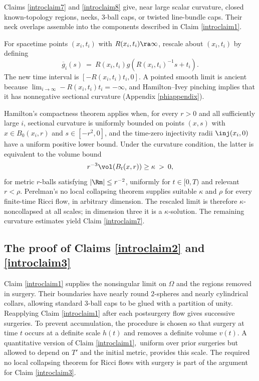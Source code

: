 Claims \ref{introclaim7} and \ref{introclaim8} give, near large scalar
curvature, closed known-topology regions, necks, $3$-ball caps, or twisted
line-bundle caps.  Their neck overlaps assemble into the components described
in Claim \ref{introclaim1}.

For spacetime points $(x_i,t_i)$ with $R(x_i,t_i)\ra\infty$, rescale about
$(x_i,t_i)$ by defining
\begin{equation}
\overline{g}_i(s)\: =\:R(x_i,t_i)g\left(R(x_i,t_i)^{-1}s+t_i\right).
\end{equation}
The new time interval is $[-R(x_i,t_i)t_i,0]$.  A pointed smooth limit is
ancient because
$\lim_{i\rightarrow\infty}-R(x_i,t_i)t_i=-\infty$, and Hamilton--Ivey
pinching implies that it has nonnegative sectional curvature
(Appendix \ref{phiappendix}).

Hamilton's compactness theorem \cite{Hamiltonnn} applies when, for every
$r>0$ and all sufficiently large $i$, sectional curvature is uniformly
bounded on points $(x,s)$ with
$x\in B_0(x_i,r)$ and $s\in[-r^2,0]$, and the time-zero injectivity radii
$\inj(x_i,0)$ have a uniform positive lower bound.  Under the curvature
condition, the latter is equivalent to the volume bound
\begin{equation} \label{bound}
r^{-3}\vol(B_t(x,r))\geq\kappa\:>\:0,
\end{equation}
for metric $r$-balls satisfying $|\Rm|\leq r^{-2}$, uniformly for
$t\in[0,T)$ and relevant $r<\rho$.  Perelman's no local collapsing theorem
\cite{Perelman} supplies suitable $\kappa$ and $\rho$ for every finite-time
Ricci flow, in arbitrary dimension.  The rescaled limit is therefore
$\kappa$-noncollapsed at all scales; in dimension three it is a
$\kappa$-solution.  The remaining curvature estimates yield Claim
\ref{introclaim7}.

\subsection{The proof of Claims \ref{introclaim2} and \ref{introclaim3}}

Claim \ref{introclaim1} supplies the nonsingular limit on $\Omega$ and the
regions removed in surgery.  Their boundaries have nearly round $2$-spheres
and nearly cylindrical collars, allowing standard $3$-ball caps to be glued
with a partition of unity.  Reapplying Claim \ref{introclaim1} after each
postsurgery flow gives successive surgeries.  To prevent accumulation, the
procedure is chosen so that surgery at time $t$ occurs at a definite scale
$h(t)$ and removes a definite volume $v(t)$.  A quantitative version of Claim
\ref{introclaim1}$,$ uniform over prior surgeries but allowed to depend on
$T'$ and the initial metric, provides this scale.  The required no local
collapsing theorem for Ricci flows with surgery is part of the argument for
Claim \ref{introclaim3}.

